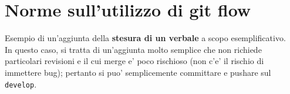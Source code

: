 \chapter{Norme sull'utilizzo di git flow}
Esempio di un'aggiunta della \textbf{stesura di un verbale} a scopo esemplificativo. \\
In questo caso, si tratta di un'aggiunta molto semplice che non richiede particolari revisioni e il cui merge e' poco rischioso (non c'e' il rischio di immettere bug); pertanto si puo' semplicemente committare e pushare sul \texttt{develop}.